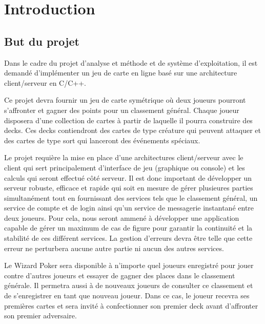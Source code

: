 \documentclass[11pt,a4paper]{article}
\begin{document}

\pagestyle{empty}
\tableofcontents
\newpage
\pagestyle{fancy}

\setcounter{page}{1}

\section{Introduction}
\label{sec:intro}

\subsection{But du projet}
\label{sec:but}

Dans le cadre du projet d'analyse et méthode et de système
d'exploitation, il est demandé d'implémenter un jeu de carte en ligne
basé sur une architecture client/serveur en C/C++.

\medbreak

Ce projet devra fournir un jeu de carte symétrique où deux joueurs
pourront s'affronter et gagner des points pour un classement
général. Chaque joueur disposera d'une collection de cartes à partir
de laquelle il pourra construire des decks. Ces decks contiendront des
cartes de type créature qui peuvent attaquer et des cartes de type
sort qui lanceront des événements spéciaux.

\medbreak

Le projet requière la mise en place d'une architectures client/serveur
avec le client qui sert principalement d'interface de jeu (graphique
ou console) et les calculs qui seront effectué côté serveur. Il est
donc important de développer un serveur robuste, efficace et rapide
qui soit en mesure de gérer plusieures parties simultanément tout en
fournissant des services tels que le classement général, un service de
compte et de login ainsi qu'un service de messagerie instantané entre
deux joueurs. Pour cela, nous seront ammené à développer une
application capable de gérer un maximum de cas de figure pour garantir
la continuité et la stabilité de ces différent services. La gestion
d'erreurs devra être telle que cette erreur ne perturbera aucune autre
partie ni aucun des autres services.

\medbreak

Le Wizard Poker sera disponible à n'importe quel joueurs enregistré
pour jouer contre d'autres joueurs et essayer de gagner des places
dans le classement générale. Il permetra aussi à de nouveaux joueurs
de consulter ce classement et de s'enregistrer en tant que nouveau
joueur. Dans ce cas, le joueur recevra ses premières cartes et sera
invité à confectionner son premier deck avant d'affronter son premier
adversaire.
\end{document}
